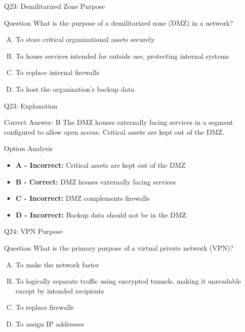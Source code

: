 \documentclass{beamer}
\begin{document}
	\begin{frame}{Q23: Demilitarized Zone Purpose}
		\begin{block}{Question}
			What is the purpose of a demilitarized zone (DMZ) in a network?
		\end{block}
		\begin{enumerate}[(A)]
			\item To store critical organizational assets securely
			\item To house services intended for outside use, protecting internal systems
			\item To replace internal firewalls
			\item To host the organization's backup data
		\end{enumerate}
	\end{frame}
	
	\begin{frame}{Q23: Explanation}
		\begin{block}{Correct Answer: B}
			The DMZ houses externally facing services in a segment configured to allow open access. Critical assets are kept out of the DMZ.
		\end{block}
		\begin{block}{Option Analysis}
			\begin{itemize}
				\item \textbf{A - Incorrect:} Critical assets are kept out of the DMZ
				\item \textbf{B - Correct:} DMZ houses externally facing services
				\item \textbf{C - Incorrect:} DMZ complements firewalls
				\item \textbf{D - Incorrect:} Backup data should not be in the DMZ
			\end{itemize}
		\end{block}
	\end{frame}
	
	\begin{frame}{Q24: VPN Purpose}
		\begin{block}{Question}
			What is the primary purpose of a virtual private network (VPN)?
		\end{block}
		\begin{enumerate}[(A)]
			\item To make the network faster
			\item To logically separate traffic using encrypted tunnels, making it unreadable except by intended recipients
			\item To replace firewalls
			\item To assign IP addresses
		\end{enumerate}
	\end{frame}
	
\end{document}
